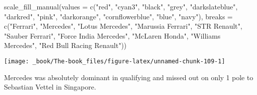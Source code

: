 \documentclass[
]{book}
\newenvironment{Shaded}{\begin{snugshade}}{\end{snugshade}}
\newcommand{\AttributeTok}[1]{\textcolor[rgb]{0.77,0.63,0.00}{#1}}
\newcommand{\FunctionTok}[1]{\textcolor[rgb]{0.00,0.00,0.00}{#1}}
\newcommand{\NormalTok}[1]{#1}
\newcommand{\StringTok}[1]{\textcolor[rgb]{0.31,0.60,0.02}{#1}}
\begin{document}
\begin{Shaded}
\begin{Highlighting}[]
  \FunctionTok{scale\_fill\_manual}\NormalTok{(}\AttributeTok{values =} \FunctionTok{c}\NormalTok{(}\StringTok{"red"}\NormalTok{, }
                                \StringTok{"cyan3"}\NormalTok{,  }
                                \StringTok{"black"}\NormalTok{, }
                                \StringTok{"grey"}\NormalTok{,}
                               \StringTok{"darkslateblue"}\NormalTok{, }
                                \StringTok{"darkred"}\NormalTok{,  }
                                \StringTok{"pink"}\NormalTok{, }
                                \StringTok{"darkorange"}\NormalTok{, }
                                \StringTok{"cornflowerblue"}\NormalTok{,}
                               \StringTok{"blue"}\NormalTok{,}
                               \StringTok{"navy"}\NormalTok{),}
                     \AttributeTok{breaks =} \FunctionTok{c}\NormalTok{(}\StringTok{"Ferrari"}\NormalTok{,}
                                 \StringTok{"Mercedes"}\NormalTok{,}
                                 \StringTok{"Lotus Mercedes"}\NormalTok{,}
                                 \StringTok{"Marussia Ferrari"}\NormalTok{,}
                                \StringTok{"STR Renault"}\NormalTok{,}
                                 \StringTok{"Sauber Ferrari"}\NormalTok{, }
                                 \StringTok{"Force India Mercedes"}\NormalTok{,}
                                 \StringTok{"McLaren Honda"}\NormalTok{,}
                                 \StringTok{"Williams Mercedes"}\NormalTok{,}
                                 \StringTok{"Red Bull Racing Renault"}\NormalTok{))}
\end{Highlighting}
\end{Shaded}

\begin{center}\texttt{[image: \_book/The-book\_files/figure-latex/unnamed-chunk-109-1]} \end{center}

Mercedes was absolutely dominant in qualifying and missed out on only 1 pole to Sebastian Vettel in Singapore.
\end{document}
